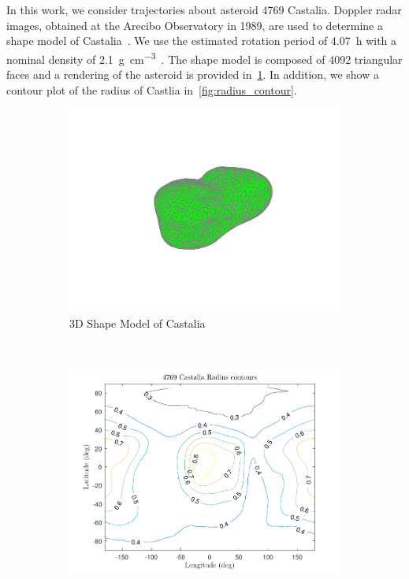 \documentclass[]{aiaa-tc}%
\begin{document}
In this work, we consider trajectories about asteroid 4769 Castalia.
Doppler radar images, obtained at the Arecibo Observatory in 1989, are used to determine a shape model of Castalia~\cite{hudson1994,neese2004}.
We use the estimated rotation period of \SI{4.07}{\hour} with a nominal density of \SI{2.1}{\gram\per\centi\meter\cubed}~\cite{scheeres1996}.
The shape model is composed of \num{4092} triangular faces and a rendering of the asteroid is provided in~\cref{fig:castalia_3d}.
In addition, we show a contour plot of the radius of Castlia in~\cref{fig:radius_contour}.
\begin{figure}
    \centering
    \begin{subfigure}[htbp]{0.45\textwidth}
        \includegraphics[width=\textwidth]{castalia}
        \caption{3D Shape Model of Castalia} \label{fig:castalia_3d}
    \end{subfigure}~ %
    \begin{subfigure}[htbp]{0.45\textwidth}
        \includegraphics[width=\textwidth]{radius_contour}

\end{subfigure}
\end{figure}
\end{document}
